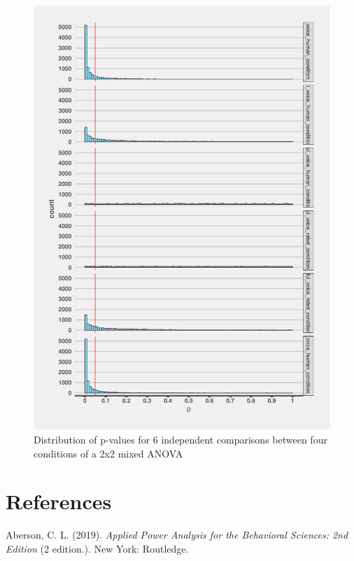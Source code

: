\documentclass[,jou, draftfirst, a4paper,floatsintext]{apa6}
\begin{document}
\begin{figure}
\centering
\includegraphics{0.1_Simulation_Based_Power_Analysis_For_Factorial_ANOVA_Designs_files/figure-latex/p-plot-1.pdf}
\caption{\label{fig:p-plot}Distribution of p-values for 6 independent comparisons between four conditions of a 2x2 mixed ANOVA}
\end{figure}

\newpage

\hypertarget{references}{%
\section{References}\label{references}}

\setlength{\parindent}{-0.5in}
\setlength{\leftskip}{0.5in}

\hypertarget{refs}{}
\leavevmode\hypertarget{ref-aberson_applied_2019}{}%
Aberson, C. L. (2019). \emph{Applied Power Analysis for the Behavioral Sciences: 2nd Edition} (2 edition.). New York: Routledge.
\end{document}
